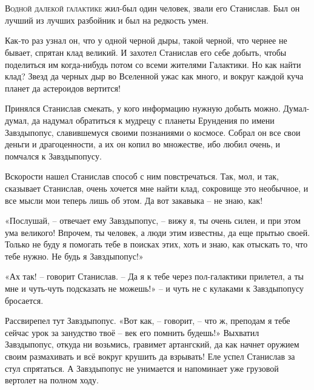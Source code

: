 \documentclass[ebook,oneside,final,openright]{memoir}
\begin{document}
\chapter{}
 \lettrine{В}{одной далекой галактике} жил-был один человек, звали его Станислав. Был он лучший из лучших разбойник и был на редкость умен.\par
\par
Как-то раз узнал он, что у одной черной дыры, такой черной, что чернее не бывает, спрятан клад великий. И захотел Станислав его себе добыть, чтобы поделиться им когда-нибудь потом со всеми жителями Галактики. Но как найти клад? Звезд да черных дыр во Вселенной ужас как много, и вокруг каждой куча планет да астероидов вертится!\par
\par
Принялся Станислав смекать, у кого информацию нужную добыть можно. Думал-думал, да надумал обратиться к мудрецу с планеты Ерундения по имени Завздыпопус, славившемуся своими познаниями о космосе. Собрал он все свои деньги и драгоценности, а их он копил во множестве, ибо любил очень, и помчался к Завздыпопусу.\par
\par
Вскорости нашел Станислав способ с ним повстречаться. Так, мол, и так, сказывает Станислав, очень хочется мне найти клад, сокровище это необычное, и все мысли мои теперь лишь об этом. Да вот закавыка – не знаю, как!\par
\par
«Послушай, – отвечает ему Завздыпопус, – вижу я, ты очень силен, и при этом ума великого! Впрочем, ты человек, а люди этим известны, да еще прытью своей. Только не буду я помогать тебе в поисках этих, хоть и знаю, как отыскать то, что тебе нужно. Не будь я Завздыпопус!» \par
\par
«Ах так! – говорит Станислав. – Да я к тебе через пол-галактики прилетел, а ты мне и чуть-чуть подсказать не можешь!» – и чуть не с кулаками к Завздыпопусу бросается. \par
\par
Рассвирепел тут Завздыпопус. «Вот как, – говорит, – что ж, преподам я тебе сейчас урок за занудство твоё – век его помнить будешь!» Выхватил Завздыпопус, откуда ни возьмись, гравимет артангский, да как начнет оружием своим размахивать и всё вокруг крушить да взрывать! Еле успел Станислав за стул спрятаться. А Завздыпопус не унимается и напоминает уже грузовой вертолет на полном ходу. \par
\par
\end{document}

